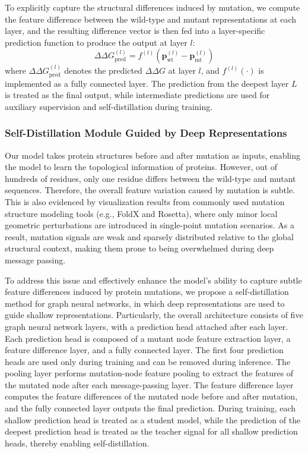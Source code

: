 \documentclass[journal,twoside,web]{ieeecolor}
\begin{document}
To explicitly capture the structural differences induced by mutation, we compute the feature difference between the wild-type and mutant representations at each layer, and the resulting difference vector is then fed into a layer-specific prediction function to produce the output at layer $l$:
\begin{equation}
\Delta\Delta G_{\text{pred}}^{(l)} = f^{(l)}\left( \bm{p}_{\text{wt}}^{(l)} - \bm{p}_{\text{mt}}^{(l)} \right)
\label{eq:predict}
\end{equation}
where $\Delta\Delta G_{\text{pred}}^{(l)}$ denotes the predicted $\Delta\Delta G$ at layer $l$, and $f^{(l)}(\cdot)$ is implemented as a fully connected layer. The prediction from the deepest layer $L$ is treated as the final output, while intermediate predictions are used for auxiliary supervision and self-distillation during training.

\subsubsection{Self-Distillation Module Guided by Deep Representations}
\label{subsubsec:distill}

Our model takes protein structures before and after mutation as inputs, enabling the model to learn the topological information of proteins. However, out of hundreds of residues, only one residue differs between the wild-type and mutant sequences. Therefore, the overall feature variation caused by mutation is subtle. This is also evidenced by visualization results from commonly used mutation structure modeling tools (e.g., FoldX and Rosetta), where only minor local geometric perturbations are introduced in single-point mutation scenarios. As a result, mutation signals are weak and sparsely distributed relative to the global structural context, making them prone to being overwhelmed during deep message passing.

To address this issue and effectively enhance the model's ability to capture subtle feature differences induced by protein mutations, we propose a self-distillation method for graph neural networks, in which deep representations are used to guide shallow representations. Particularly, the overall architecture consists of five graph neural network layers, with a prediction head attached after each layer. Each prediction head is composed of a mutant node feature extraction layer, a feature difference layer, and a fully connected layer. The first four prediction heads are used only during training and can be removed during inference. The pooling layer performs mutation-node feature pooling to extract the features of the mutated node after each message-passing layer. The feature difference layer computes the feature differences of the mutated node before and after mutation, and the fully connected layer outputs the final prediction. During training, each shallow prediction head is treated as a student model, while the prediction of the deepest prediction head is treated as the teacher signal for all shallow prediction heads, thereby enabling self-distillation.
\end{document}
